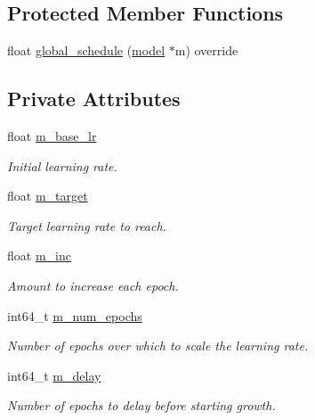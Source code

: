 \subsection*{Protected Member Functions}
\begin{DoxyCompactItemize}
\item 
float \hyperlink{classlbann_1_1lbann__callback__linear__growth__learning__rate_ad292e2e7f4078162ed93b6e05d94e0e4}{global\+\_\+schedule} (\hyperlink{classlbann_1_1model}{model} $\ast$m) override
\end{DoxyCompactItemize}
\subsection*{Private Attributes}
\begin{DoxyCompactItemize}
\item 
float \hyperlink{classlbann_1_1lbann__callback__linear__growth__learning__rate_a2fe23a59744da5c0c737eb9d301bc23b}{m\+\_\+base\+\_\+lr}
\begin{DoxyCompactList}\small\item\em Initial learning rate. \end{DoxyCompactList}\item 
float \hyperlink{classlbann_1_1lbann__callback__linear__growth__learning__rate_a56cc1954ef76d494c4b5d5074c326fca}{m\+\_\+target}
\begin{DoxyCompactList}\small\item\em Target learning rate to reach. \end{DoxyCompactList}\item 
float \hyperlink{classlbann_1_1lbann__callback__linear__growth__learning__rate_ad68e1fbbe86eb692cf26d0d4a452c469}{m\+\_\+inc}
\begin{DoxyCompactList}\small\item\em Amount to increase each epoch. \end{DoxyCompactList}\item 
int64\+\_\+t \hyperlink{classlbann_1_1lbann__callback__linear__growth__learning__rate_ac583819b3ee7fad93b9b96b44dfb4307}{m\+\_\+num\+\_\+epochs}
\begin{DoxyCompactList}\small\item\em Number of epochs over which to scale the learning rate. \end{DoxyCompactList}\item 
int64\+\_\+t \hyperlink{classlbann_1_1lbann__callback__linear__growth__learning__rate_a0a0a9c7f9964e3f8693706800fcdf06a}{m\+\_\+delay}
\begin{DoxyCompactList}\small\item\em Number of epochs to delay before starting growth. \end{DoxyCompactList}\end{DoxyCompactItemize}
